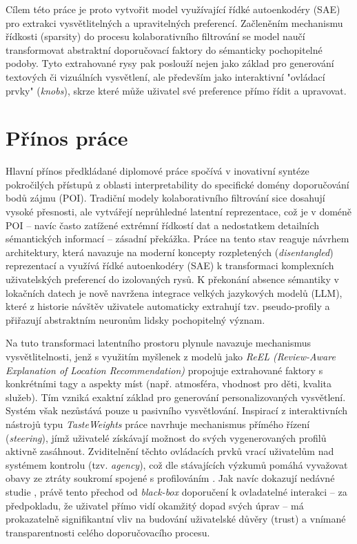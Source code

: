 Cílem této práce je proto vytvořit model využívající řídké autoenkodéry (SAE) pro extrakci vysvětlitelných a upravitelných preferencí. Začleněním mechanismu řídkosti (sparsity) do procesu kolaborativního filtrování se model naučí transformovat abstraktní doporučovací faktory do sémanticky pochopitelné podoby. Tyto extrahované rysy pak poslouží nejen jako základ pro generování textových či vizuálních vysvětlení, ale především jako interaktivní "ovládací prvky" (\textit{knobs}), skrze které může uživatel své preference přímo řídit a upravovat.

\section*{Přínos práce}
Hlavní přínos předkládané diplomové práce spočívá v inovativní syntéze pokročilých přístupů z oblasti interpretability do specifické domény doporučování bodů zájmu (POI). Tradiční modely kolaborativního filtrování sice dosahují vysoké přesnosti, ale vytvářejí neprůhledné latentní reprezentace, což je v doméně POI – navíc často zatížené extrémní řídkostí dat a nedostatkem detailních sémantických informací – zásadní překážka. Práce na tento stav reaguje návrhem architektury, která navazuje na moderní koncepty rozpletených (\textit{disentangled}) reprezentací \cite{Wang2021} a využívá řídké autoenkodéry (SAE) \cite{Spisak2024} k transformaci komplexních uživatelských preferencí do izolovaných rysů. K překonání absence sémantiky v lokačních datech je nově navržena integrace velkých jazykových modelů (LLM), které z historie návštěv uživatele automaticky extrahují tzv. pseudo-profily \cite{Zeng2025} a přiřazují abstraktním neuronům lidsky pochopitelný význam.

Na tuto transformaci latentního prostoru plynule navazuje mechanismus vysvětlitelnosti, jenž s využitím myšlenek z modelů jako \textit{ReEL (Review-Aware Explanation of Location Recommendation)} \cite{Baral2018} propojuje extrahované faktory s konkrétními tagy a aspekty míst (např. atmosféra, vhodnost pro děti, kvalita služeb). Tím vzniká exaktní základ pro generování personalizovaných vysvětlení. Systém však nezůstává pouze u pasivního vysvětlování. Inspirací z interaktivních nástrojů typu \textit{TasteWeights} \cite{Bostandjiev2012} práce navrhuje mechanismus přímého řízení (\textit{steering}), jímž uživatelé získávají možnost do svých vygenerovaných profilů aktivně zasáhnout. Zviditelnění těchto ovládacích prvků vrací uživatelům nad systémem kontrolu (tzv. \textit{agency}), což dle stávajících výzkumů pomáhá vyvažovat obavy ze ztráty soukromí spojené s profilováním \cite{Knijnenburg2012}. Jak navíc dokazují nedávné studie \cite{Ooge2023}, právě tento přechod od \textit{black-box} doporučení k ovladatelné interakci – za předpokladu, že uživatel přímo vidí okamžitý dopad svých úprav – má prokazatelně signifikantní vliv na budování uživatelské důvěry (trust) a vnímané transparentnosti celého doporučovacího procesu.

